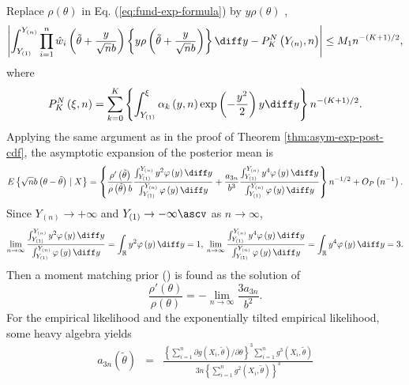 \begin{example}
Replace $\rho\left(\theta\right)$ in Eq. (\ref{eq:fund-exp-formula})
by $y\rho\left(\theta\right)$ , 
\[
\left|\int_{Y_{\left(1\right)}}^{Y_{\left(n\right)}}\prod_{i=1}^{n}\hat{w}_{i}\left(\tilde{\theta}+\frac{y}{\sqrt{n}b}\right)\left\{ y\rho\left(\tilde{\theta}+\frac{y}{\sqrt{n}b}\right)\right\} \diff y-P_{K}^{N}\left(Y_{\left(n\right)},n\right)\right|\le M_{1}n^{-\left(K+1\right)/2},
\]
where 
\[
P_{K}^{N}\left(\xi,n\right)=\sum_{k=0}^{K}\left\{ \int_{Y_{\left(1\right)}}^{\xi}\alpha_{k}\left(y,n\right)\exp\left(-\frac{y^{2}}{2}\right)y\diff y\right\} n^{-\left(K+1\right)/2}.
\]
Applying the same argument as in the proof of Theorem \ref{thm:asym-exp-post-cdf},
the asymptotic expansion of the posterior mean is 
\[
E\left\{ \sqrt{n}b\left(\theta-\tilde{\theta}\right)\mid X\right\} =\left\{ \frac{\rho'\left(\tilde{\theta}\right)}{\rho\left(\tilde{\theta}\right)b}\frac{\int_{Y_{\left(1\right)}}^{Y_{\left(n\right)}}y^{2}\varphi\left(y\right)\diff y}{\int_{Y_{\left(1\right)}}^{Y_{\left(n\right)}}\varphi\left(y\right)\diff y}+\frac{a_{3n}}{b^{3}}\frac{\int_{Y_{\left(1\right)}}^{Y_{\left(n\right)}}y^{4}\varphi\left(y\right)\diff y}{\int_{Y_{\left(1\right)}}^{Y_{\left(n\right)}}\varphi\left(y\right)\diff y}\right\} n^{-1/2}+O_{P}\left(n^{-1}\right).
\label{eq:expand-posterior-mean}
\]
Since $ Y_{\left( n \right )} \rightarrow + \infty $ and $ Y_{\left (1\right )} \rightarrow - \infty\ascv $ as $n\rightarrow\infty$,
\[
	\lim_{n\rightarrow\infty} \frac{\int_{Y_{\left(1\right)}}^{Y_{\left(n\right)}}y^{2}\varphi\left(y\right)\diff y}{\int_{Y_{\left(1\right)}}^{Y_{\left(n\right)}}\varphi\left(y\right)\diff y} = \int_{\mathbb{R}} y^2 \varphi \left(y\right) \diff y=1,\:
	\lim_{n\rightarrow\infty} \frac{\int_{Y_{\left(1\right)}}^{Y_{\left(n\right)}}y^{4}\varphi\left(y\right)\diff y}{\int_{Y_{\left(1\right)}}^{Y_{\left(n\right)}}\varphi\left(y\right)\diff y} = \int_{\mathbb{R}} y^4 \varphi \left(y\right) \diff y=3.
\]
Then a moment matching prior (\cite{ghosh2011moment}) is found as  the
solution of 
\[
\frac{\rho'\left(\theta\right)}{\rho\left(\theta\right)}=-\lim_{n\rightarrow\infty}\frac{3a_{3n}}{b^{2}}.
\]
 For the empirical likelihood and the 
exponentially tilted empirical likelihood, some heavy algebra yields
\begin{eqnarray*}
a_{3n}\left(\tilde{\theta}\right) & = & \frac{\left\{ \sum_{i=1}^{n}\partial g\left(X_{i},\tilde{\theta}\right)/\partial\theta\right\} ^{3}\sum_{i=1}^{n}g^{3}\left(X_{i},\tilde{\theta}\right)}{3n\left\{ \sum_{i=1}^{n}g^{2}\left(X_{i},\tilde{\theta}\right)\right\} ^{3}}\\

\end{eqnarray*}
\end{example}
